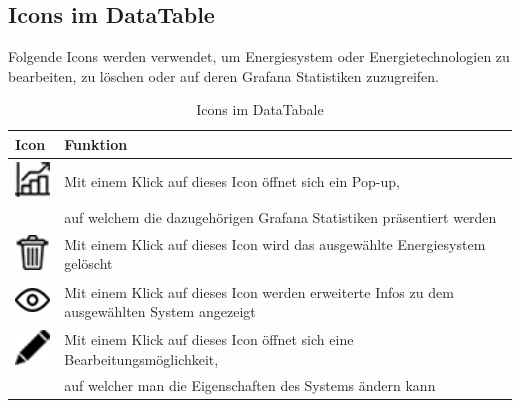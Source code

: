 \subsection{Icons im DataTable}
Folgende Icons werden  verwendet, um Energiesystem oder Energietechnologien zu bearbeiten, zu löschen oder auf deren Grafana Statistiken zuzugreifen.
\begin{table}[h]
	\begin{tabular}[t]{|l|l|}
		\hline
		Icon & Funktion                                                                                     \\ \hline
			\includegraphics[height=1cm,width=1cm]{images/Icons/statistik}& Mit einem Klick auf dieses Icon öffnet sich ein Pop-up,\\& auf welchem die dazugehörigen  Grafana Statistiken präsentiert werden       \\ \hline
			\includegraphics[height=1cm,width=1cm]{images/Icons/delete}  & Mit einem Klick auf dieses Icon wird das ausgewählte Energiesystem gelöscht                  \\ \hline
			\includegraphics[height=1cm,width=1cm]{images/Icons/auge} & Mit einem Klick auf dieses Icon werden erweiterte Infos zu dem ausgewählten System angezeigt \\ \hline
			\includegraphics[height=1cm,width=1cm]{images/Icons/stift} & Mit einem Klick auf dieses Icon öffnet sich eine Bearbeitungsmöglichkeit,\\& auf welcher man die Eigenschaften des Systems ändern kann \\ \hline
	\end{tabular}
	\caption{Icons im DataTabale}
\label{tab: Icons im DataTabales}
\end{table}

